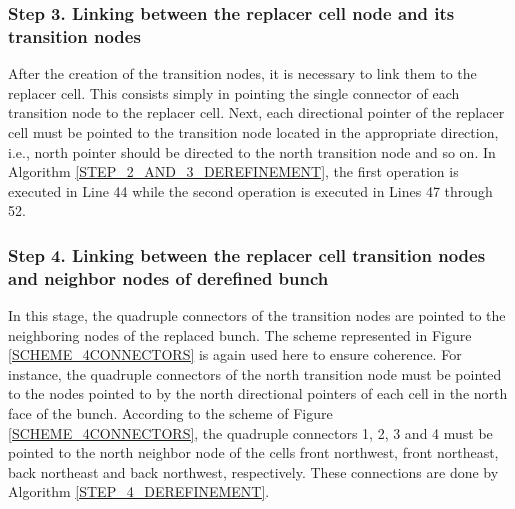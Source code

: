 \subsubsection*{Step 3. Linking between the replacer cell node and its transition nodes}
After the creation of the transition nodes, it is necessary to link
them to the replacer cell. This consists simply in pointing the
single connector of each transition node to the replacer cell. Next,
each directional pointer of the replacer cell must be pointed to the
transition node located in the appropriate direction, i.e., north
pointer should be directed to the north transition node and so on.
In Algorithm \ref{STEP_2_AND_3_DEREFINEMENT}, the first operation is
executed in Line 44 while the second operation is executed in Lines
47 through 52.

\subsubsection*{Step 4. Linking between the replacer cell transition nodes and neighbor nodes of derefined bunch}
In this stage, the quadruple connectors of the transition nodes are
pointed to the neighboring nodes of the replaced bunch. The scheme
represented in Figure \ref{SCHEME_4CONNECTORS} is again used here to
ensure coherence. For instance, the quadruple connectors of the
north transition node must be pointed to the nodes pointed to by the
north directional pointers of each cell in the north face of the
bunch. According to the scheme of Figure \ref{SCHEME_4CONNECTORS},
the quadruple connectors 1, 2, 3 and 4 must be pointed to the north
neighbor node of the cells front northwest, front northeast, back
northeast and back northwest, respectively. These connections are
done by Algorithm \ref{STEP_4_DEREFINEMENT}.

